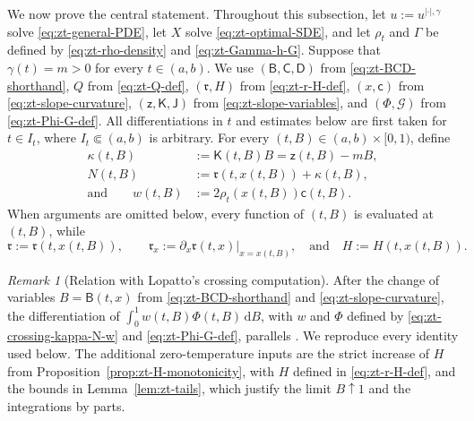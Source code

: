 \documentclass[10pt]{amsart}
\theoremstyle{definition}
\theoremstyle{remark}
\newtheorem{remark}[remark]{Remark}
\numberwithin{equation}{section}
\newcommand{\1}{\mathbf 1}
\newcommand{\cG}{\mathcal G}
\newcommand{\dd}{\,\mathrm d}
\begin{document}
We now prove the central statement. Throughout this subsection, let $u:=u^{|\cdot|,\gamma}$ solve \eqref{eq:zt-general-PDE}, let $X$ solve \eqref{eq:zt-optimal-SDE}, and let $\rho_t$ and $\Gamma$ be defined by \eqref{eq:zt-rho-density} and \eqref{eq:zt-Gamma-h-G}. Suppose that $\gamma(t)=m>0$ for every $t\in(a,b)$. We use $(\mathsf B,\mathsf C,\mathsf D)$ from \eqref{eq:zt-BCD-shorthand}, $Q$ from \eqref{eq:zt-Q-def}, $(\mathfrak r,H)$ from \eqref{eq:zt-r-H-def}, $(x,\mathsf c)$ from \eqref{eq:zt-slope-curvature}, $(\mathsf z,\mathsf K,\mathsf J)$ from \eqref{eq:zt-slope-variables}, and $(\Phi,\cG)$ from \eqref{eq:zt-Phi-G-def}. All differentiations in $t$ and estimates below are first taken for $t\in I_t$, where $I_t\Subset(a,b)$ is arbitrary. For every $(t,B)\in(a,b)\times[0,1)$, define
\begin{equation}
\begin{aligned}
 \kappa(t,B)&:=\mathsf K(t,B)B=\mathsf z(t,B)-mB,\\
 N(t,B)&:=\mathfrak r(t,x(t,B))+\kappa(t,B),\\
 \text{and}\qquad w(t,B)&:=2\rho_t(x(t,B))\mathsf c(t,B).
\end{aligned}
\label{eq:zt-crossing-kappa-N-w}
\end{equation}
When arguments are omitted below, every function of $(t,B)$ is evaluated at $(t,B)$, while
\begin{equation*}
 \mathfrak r:=\mathfrak r(t,x(t,B)),\qquad
 \mathfrak r_x:=\partial_x\mathfrak r(t,x)\big|_{x=x(t,B)},
 \quad\text{and}\quad
 H:=H(t,x(t,B)).
\end{equation*}

\begin{remark}[Relation with Lopatto's crossing computation]
\label{rem:zt-Lopatto-crossing}
After the change of variables $B=\mathsf B(t,x)$ from \eqref{eq:zt-BCD-shorthand} and \eqref{eq:zt-slope-curvature}, the differentiation of $\int_0^1w(t,B)\Phi(t,B)\dd B$, with $w$ and $\Phi$ defined by \eqref{eq:zt-crossing-kappa-N-w} and \eqref{eq:zt-Phi-G-def}, parallels \cite[Proposition~9.1]{Lopatto2026}. We reproduce every identity used below. The additional zero-temperature inputs are the strict increase of $H$ from Proposition~\ref{prop:zt-H-monotonicity}, with $H$ defined in \eqref{eq:zt-r-H-def}, and the bounds in Lemma~\ref{lem:zt-tails}, which justify the limit $B\uparrow1$ and the integrations by parts.
\end{remark}
\end{document}
